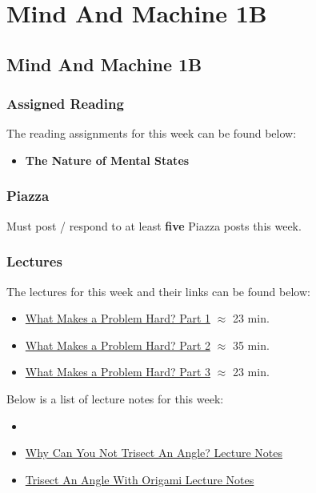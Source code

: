 \clearpage

\renewcommand{\ChapTitle}{Mind And Machine 1B}
\renewcommand{\SectionTitle}{Mind And Machine 1B}

\chapter{\ChapTitle}
\section{\SectionTitle}

\subsection{Assigned Reading}

The reading assignments for this week can be found below:

\begin{itemize}
    \item \textbf{The Nature of Mental States}
\end{itemize}

\subsection{Piazza}

Must post / respond to at least \textbf{five} Piazza posts this week.

\subsection{Lectures}

The lectures for this week and their links can be found below:

\begin{itemize}
    \item \href{https://applied.cs.colorado.edu/mod/hvp/view.php?id=49327}{What Makes a Problem Hard? Part 1} $\approx$ 23 min.
    \item \href{https://www.youtube.com/watch?v=3kRKoFurkyU}{What Makes a Problem Hard? Part 2} $\approx$ 35 min.
    \item \href{https://www.youtube.com/watch?v=LxVXcaE9aPM}{What Makes a Problem Hard? Part 3} $\approx$ 23 min.
\end{itemize}

\noindent Below is a list of lecture notes for this week:

\begin{itemize}
    \item {}
    \item \href{https://www.youtube.com/watch?v=6Lm9EHhbJAY}{Why Can You Not Trisect An Angle? Lecture Notes}
    \item \href{https://www.youtube.com/watch?v=SL2lYcggGpc}{Trisect An Angle With Origami Lecture Notes}
\end{itemize}

